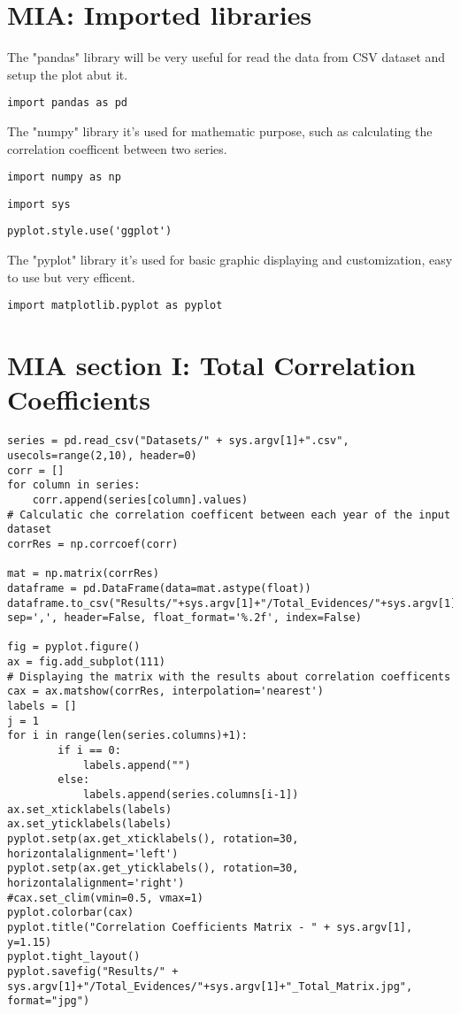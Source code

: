 \label{MIA_Implementation}
\section{MIA: Imported libraries}
\label{MIA_Libraries}
The "pandas" library will be very useful for read the data from CSV dataset and setup the plot abut it.
\begin{lstlisting}
import pandas as pd
\end{lstlisting}

The "numpy" library it's used for mathematic purpose, such as calculating the correlation coefficent between two series.
\begin{lstlisting}
import numpy as np
\end{lstlisting}

\begin{lstlisting}
import sys
\end{lstlisting}


\begin{lstlisting}
pyplot.style.use('ggplot')
\end{lstlisting}
 
The "pyplot" library it's used for basic graphic displaying and customization, easy to use but very efficent.
\begin{lstlisting}
import matplotlib.pyplot as pyplot
\end{lstlisting}

\section{MIA section I: Total Correlation Coefficients}
\label{MIA_section_I}

\begin{lstlisting}
series = pd.read_csv("Datasets/" + sys.argv[1]+".csv", usecols=range(2,10), header=0)
corr = []
for column in series:
    corr.append(series[column].values)
# Calculatic che correlation coefficent between each year of the input dataset
corrRes = np.corrcoef(corr)

mat = np.matrix(corrRes)
dataframe = pd.DataFrame(data=mat.astype(float))
dataframe.to_csv("Results/"+sys.argv[1]+"/Total_Evidences/"+sys.argv[1]+"_CorrCoeff.csv", sep=',', header=False, float_format='%.2f', index=False)

fig = pyplot.figure()
ax = fig.add_subplot(111)
# Displaying the matrix with the results about correlation coefficents
cax = ax.matshow(corrRes, interpolation='nearest')
labels = []
j = 1
for i in range(len(series.columns)+1):
		if i == 0:
			labels.append("")
		else:
			labels.append(series.columns[i-1])
ax.set_xticklabels(labels)
ax.set_yticklabels(labels)
pyplot.setp(ax.get_xticklabels(), rotation=30, horizontalalignment='left')
pyplot.setp(ax.get_yticklabels(), rotation=30, horizontalalignment='right')
#cax.set_clim(vmin=0.5, vmax=1) 
pyplot.colorbar(cax)
pyplot.title("Correlation Coefficients Matrix - " + sys.argv[1], y=1.15)
pyplot.tight_layout()
pyplot.savefig("Results/" + sys.argv[1]+"/Total_Evidences/"+sys.argv[1]+"_Total_Matrix.jpg", format="jpg")

\end{lstlisting}
